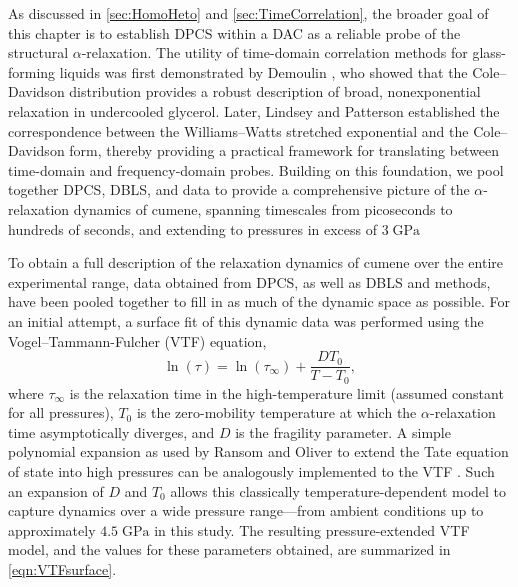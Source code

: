 As discussed in \sect \ref{sec:HomoHeto} and \sect \ref{sec:TimeCorrelation}, the broader goal of this chapter is to establish DPCS within a DAC as a reliable probe of the structural $\alpha$-relaxation. The utility of time-domain correlation methods for glass-forming liquids was first demonstrated by Demoulin \etal, who showed that the Cole--Davidson distribution provides a robust description of broad, nonexponential relaxation in undercooled glycerol\nolinebreak\cite{Demoulin}. Later, Lindsey and Patterson established the correspondence between the Williams--Watts stretched exponential and the Cole--Davidson form, thereby providing a practical framework for translating between time-domain and frequency-domain probes\nolinebreak\cite{Lindsey}. Building on this foundation, we pool together DPCS, DBLS, and \tgp data to provide a comprehensive picture of the $\alpha$-relaxation dynamics of cumene, spanning timescales from picoseconds to hundreds of seconds, and extending to pressures in excess of $ 3\;\si{\giga\pascal}$
	
To obtain a full description of the relaxation dynamics of cumene over the entire experimental range, data obtained from DPCS, as well as DBLS and \tgp methods, have been pooled together to fill in as much of the dynamic space as possible. For an initial attempt, a surface fit of this dynamic data was performed using the Vogel–Tammann-Fulcher (VTF) equation,
\begin{equation}
	\ln(\tau)=\ln(\tau_{\infty}) +\frac{DT_{0}}{T-T_{0}},
	\label{eqn:VTF}
\end{equation}
where $\tau_{\infty}$ is the relaxation time in the high-temperature limit (assumed constant for all pressures), $T_{0}$ is the zero-mobility temperature at which the $\alpha$-relaxation time asymptotically diverges, and $D$ is the fragility parameter. A simple polynomial expansion as used by Ransom and Oliver to extend the Tate equation of state into high pressures can be analogously implemented to the VTF \eqn \cite{RansomPRL}. Such an expansion of $D$ and $T_{0}$ allows this classically temperature-dependent model to capture dynamics over a wide pressure range—from ambient conditions up to approximately $4.5\;\si{\giga\pascal}$ in this study. The resulting pressure-extended VTF model, and the values for these parameters obtained, are summarized in \eqn \ref{eqn:VTFsurface}.

